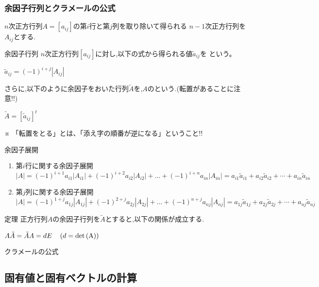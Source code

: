 \documentclass[a4paper]{jsarticle}
\begin{document}
\subsubsection{余因子行列とクラメールの公式}
$n$次正方行列$A=\left[a_{ij}\right]$の第$i$行と第$j$列を取り除いて得られる
$n-1$次正方行列を$A_{ij}$とする.
\begin{itembox}[l]{余因子行列}
    $n$次正方行列$\left[a_{ij}\right]$に対し,以下の式から得られる値$\tilde{a}_{ij}$を
    という。
    \begin{center}
        $\tilde{a}_{ij}=\left(-1\right)^{i+j}\left|A_{ij}\right|$
    \end{center}
    さらに,以下のように余因子をおいた行列$\tilde{A}$を,$A$のという.(転置があることに注意!!)
    \begin{center}
        $\tilde{A}=\left[\tilde{a}_{ij}\right]^t$
    \end{center}
    ※ 「転置をとる」とは、「添え字の順番が逆になる」ということ!!
\end{itembox}
\begin{itembox}[l]{余因子展開}
    \begin{enumerate}[(1)]
        \item 第$i$行に関する余因子展開\\
              $\left|A\right|=(-1)^{i+1}a_{i1}\left|A_{i1}\right|+(-1)^{i+2}a_{i2}\left|A_{i2}\right|+ \dots +(-1)^{i+n}a_{in}\left|A_{in}\right|
                  =a_{i1}\tilde{a}_{i1}+a_{i2}\tilde{a}_{i2}+\cdots +a_{in}\tilde{a}_{in}$
        \item 第$j$列に関する余因子展開\\
              $\left|A\right|=(-1)^{1+j}a_{1j}\left|A_{1j}\right|+(-1)^{2+j}a_{2j}\left|A_{2j}\right|+ \dots +(-1)^{n+j}a_{nj}\left|A_{nj}\right|
                  =a_{1j}\tilde{a}_{1j}+a_{2j}\tilde{a}_{2j}+\cdots +a_{nj}\tilde{a}_{nj}$
    \end{enumerate}
\end{itembox}
\begin{itembox}[l]{定理}
    正方行列$A$の余因子行列を$\tilde{A}$とすると,以下の関係が成立する.
    \begin{center}
        $A\tilde{A}=\tilde{A}A=dE\quad\left(d=\rm{det}\left(A\right)\right)$
    \end{center}
\end{itembox}
\begin{itembox}[l]{クラメールの公式}
\end{itembox}
\subsection{固有値と固有ベクトルの計算}
\end{document}
